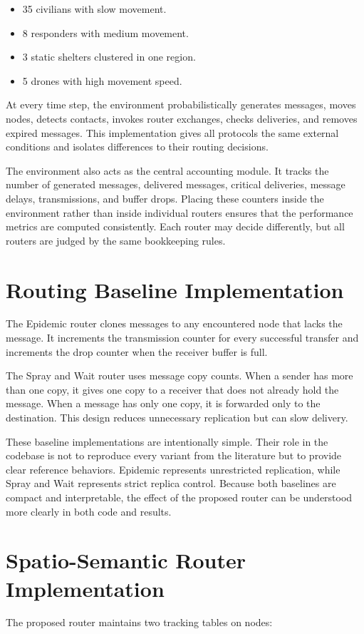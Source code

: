 \begin{itemize}
	\item 35 civilians with slow movement.
	\item 8 responders with medium movement.
	\item 3 static shelters clustered in one region.
	\item 5 drones with high movement speed.
\end{itemize}

At every time step, the environment probabilistically generates messages, moves nodes, detects contacts, invokes router exchanges, checks deliveries, and removes expired messages. This implementation gives all protocols the same external conditions and isolates differences to their routing decisions.

The environment also acts as the central accounting module. It tracks the number of generated messages, delivered messages, critical deliveries, message delays, transmissions, and buffer drops. Placing these counters inside the environment rather than inside individual routers ensures that the performance metrics are computed consistently. Each router may decide differently, but all routers are judged by the same bookkeeping rules.

\section{Routing Baseline Implementation}
The Epidemic router clones messages to any encountered node that lacks the message. It increments the transmission counter for every successful transfer and increments the drop counter when the receiver buffer is full.

The Spray and Wait router uses message copy counts. When a sender has more than one copy, it gives one copy to a receiver that does not already hold the message. When a message has only one copy, it is forwarded only to the destination. This design reduces unnecessary replication but can slow delivery.

These baseline implementations are intentionally simple. Their role in the codebase is not to reproduce every variant from the literature but to provide clear reference behaviors. Epidemic represents unrestricted replication, while Spray and Wait represents strict replica control. Because both baselines are compact and interpretable, the effect of the proposed router can be understood more clearly in both code and results.

\section{Spatio-Semantic Router Implementation}
The proposed router maintains two tracking tables on nodes:

